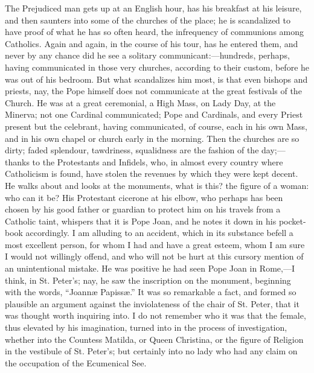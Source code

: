 The Prejudiced man gets up at an English hour, has his
breakfast at his leisure, and then saunters into some of
the churches of the place; he is scandalized to have
proof of what he has so often heard, the infrequency of
communions among Catholics. Again and again, in the
course of his tour, has he entered them, and never by any
chance did he see a solitary communicant:—hundreds,
perhaps, having communicated in those very churches,
according to their custom, before he was out of his
bedroom. But what scandalizes him most, is that even
bishops and priests, nay, the Pope himself does not
communicate at the great festivals of the Church. He was
at a great ceremonial, a High Mass, on Lady Day, at the
Minerva; not one Cardinal communicated; Pope and
Cardinals, and every Priest present but the celebrant,
having communicated, of course, each in his own Mass, and
in his own chapel or church early in the morning. Then
the churches are so dirty; faded splendour, tawdriness,
squalidness are the fashion of the day;—thanks to
the Protestants and Infidels, who, in almost every
country where Catholicism is found, have stolen the
revenues by which they were kept decent. He walks about
and looks at the monuments, what is this? the figure of a
woman: who can it be? His Protestant cicerone at his
elbow, who perhaps has been chosen by his good father or
guardian to protect him on his travels from a Catholic
taint, whispers that it is Pope Joan, and he notes it
down in his pocket-book accordingly. I am alluding to an
accident, which in its substance befell a most excellent
person, for whom I had and have a great esteem, whom I am
sure I would not willingly offend, and who will not be
hurt at this cursory mention of an unintentional mistake.
He was positive he had seen Pope Joan in Rome,—I
think, in St. Peter's; nay, he saw the inscription on the
monument, beginning with the words, ``Joannæ Papissæ.'' It was so remarkable a fact, and formed
so plausible an argument against the inviolateness of the
chair of St. Peter, that it was thought worth inquiring
into. I do not remember who it was that the female, thus
elevated by his imagination, turned into in the process
of investigation, whether into the Countess Matilda, or
Queen Christina, or the figure of Religion in the
vestibule of St. Peter's; but certainly into no lady who
had any claim on the occupation of the Ecumenical See.

